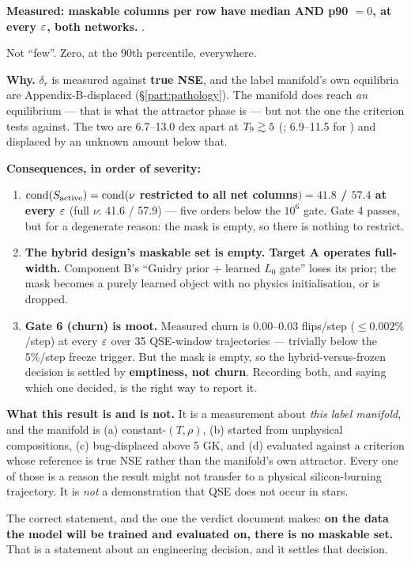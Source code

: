 \textbf{Measured: maskable columns per row have median AND p90 $= 0$, at every
$\varepsilon$, both networks.} .

Not ``few''. Zero, at the 90th percentile, everywhere.

\textbf{Why.} $\delta_r$ is measured against \textbf{true NSE}, and the label
manifold's own equilibria are Appendix-B-displaced (\S\ref{part:pathology}).
The manifold does reach \emph{an} equilibrium --- that is what the attractor
phase is --- but not the one the criterion tests against. The two are
6.7--13.0 dex apart at $T_{9} \gtrsim 5$ (; 6.9--11.5 for ) and
displaced by an unknown amount below that.

\textbf{Consequences, in order of severity:}

\begin{enumerate}
\item \textbf{$\operatorname{cond}(S_{\mathrm{active}}) = \operatorname{cond}(\nu$ restricted to all net columns$) =
  41.8$ / $57.4$ at every $\varepsilon$} (full $\nu$: 41.6 / 57.9) --- five orders
  below the $10^{6}$ gate. Gate 4 passes, but for a degenerate reason: the mask
  is empty, so there is nothing to restrict.
\item \textbf{The hybrid design's maskable set is empty. Target A operates
  full-width.} Component B's ``Guidry prior $+$ learned $L_0$ gate'' loses its
  prior; the mask becomes a purely learned object with no physics
  initialisation, or is dropped.
\item \textbf{Gate 6 (churn) is moot.} Measured churn is 0.00--0.03 flips/step
  ($\le 0.002\%$/step) at every $\varepsilon$ over 35 QSE-window trajectories ---
  trivially below the 5\%/step freeze trigger. But the mask is empty, so the
  hybrid-versus-frozen decision is settled by \textbf{emptiness, not churn}.
  Recording both, and saying which one decided, is the right way to report it.
\end{enumerate}

\textbf{What this result is and is not.} It is a measurement about \emph{this
label manifold}, and the manifold is (a) constant-$(T, \rho)$, (b) started from
unphysical compositions, (c) bug-displaced above 5 GK, and (d) evaluated
against a criterion whose reference is true NSE rather than the manifold's own
attractor. Every one of those is a reason the result might not transfer to a
physical silicon-burning trajectory. It is \emph{not} a demonstration that QSE
does not occur in stars.

The correct statement, and the one the verdict document makes: \textbf{on the
data the model will be trained and evaluated on, there is no maskable set.}
That is a statement about an engineering decision, and it settles that
decision.

